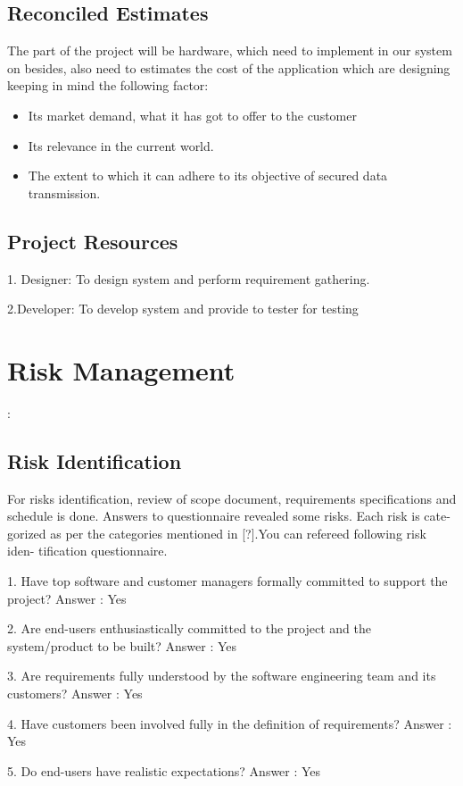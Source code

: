\documentclass[oneside,a4paper,12pt]{report}
\begin{document}
{\subsection{Reconciled Estimates}
The part of the project will be hardware, which need to implement in our system on besides, also need to estimates the cost of the application which are designing keeping in mind the following factor:
\begin{itemize}
\item	Its market demand, what it has got to offer to the customer
\item Its relevance in the current world.
\item The extent to which it can adhere to its objective of secured data transmission.
\end{itemize}

\subsection{Project Resources}
1.  Designer: To design system and perform requirement gathering.

2.Developer: To develop system and provide to tester for testing

\newpage
\section{Risk Management}:
\subsection*{Risk Identification}
For risks identification, review of scope document, requirements specifications and schedule is done. Answers to questionnaire revealed some risks. Each risk is cate- gorized as per the categories mentioned in [?].You can refereed following risk iden- tification questionnaire.

1.	Have top software and customer managers formally committed to support the project?
Answer : Yes

2.	Are end-users enthusiastically committed to the project and the system/product to be built?
Answer : Yes

3.	Are requirements fully understood by the software engineering team and its customers?
Answer : Yes

4.	Have customers been involved fully in the definition of requirements?
Answer : Yes

5.	Do end-users have realistic expectations?
Answer : Yes

}
\end{document}

